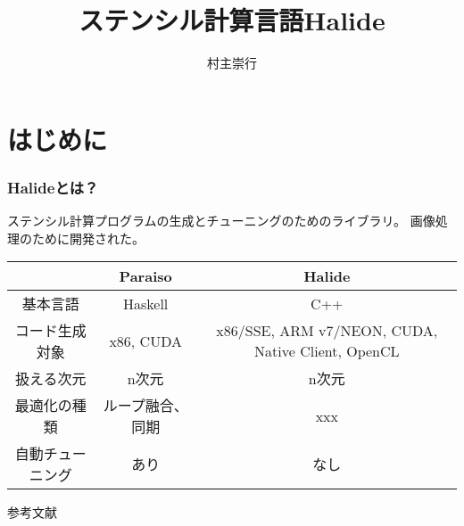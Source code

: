 \documentclass{beamer}  %
\theoremstyle{example}
\begin{document}


\title[Halide]{ステンシル計算言語Halide}
\author[T. Muranushi]{村主崇行}            %

\begin{frame}                  %
\titlepage                     %
\end{frame}

\begin{frame}                  %
\tableofcontents
\end{frame}

\section{はじめに} 
\begin{frame}\frametitle{Halideとは？}
\citet{johnson2008notes}
ステンシル計算プログラムの生成とチューニングのためのライブラリ。
画像処理のために開発された。\citep{moczo2007finite}


\begin{center}
  \begin{tabular}{|c|c|c|}
    \hline
    &Paraiso & Halide\\
    \hline
    基本言語 & Haskell & C++ \\
    コード生成対象 & x86, CUDA &
    \multicolumn{1}{p{5cm}|}{x86/SSE, ARM v7/NEON, CUDA, Native Client, OpenCL }\\
    扱える次元 & n次元 & n次元 \\ 
    最適化の種類 & ループ融合、同期 & xxx \\ 
    自動チューニング & あり & なし \\ 
    \hline
  \end{tabular}
\end{center}
\end{frame}





\begin{frame}[allowframebreaks]{参考文献}{}

\end{frame}
\end{document}
